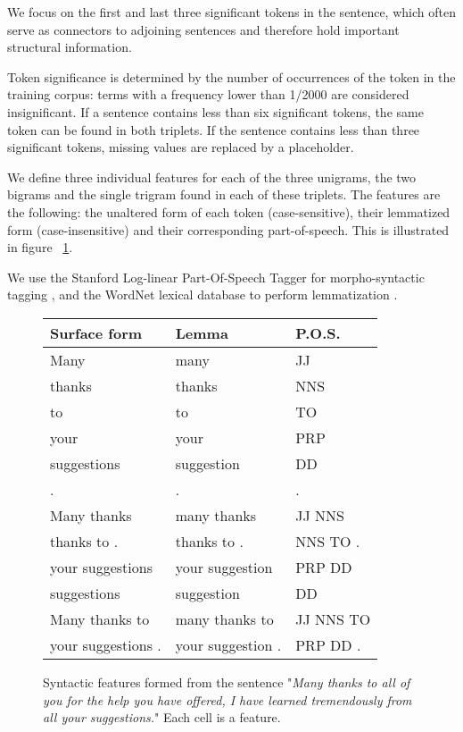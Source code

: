 We focus on the first and last three significant tokens in the sentence, which often serve as connectors to adjoining sentences and therefore hold important structural information.

Token significance is determined by the number of occurrences of the token in the training corpus: terms with a frequency lower than 1/2000 are considered insignificant. If a sentence contains less than six significant tokens, the same token can be found in both triplets. If the sentence contains less than three significant tokens, missing values are replaced by a placeholder.

We define three individual features for each of the three unigrams, the two bigrams and the single trigram found in each of these triplets. The features are the following: the unaltered form of each token (case-sensitive), their lemmatized form (case-insensitive) and their corresponding part-of-speech. This is illustrated in figure ~\ref{fig:exampleSyntacticFeatures}.

We use the Stanford Log-linear Part-Of-Speech Tagger for morpho-syntactic tagging \cite{toutanova2003feature}, and the WordNet lexical database to perform lemmatization \cite{miller1995wordnet}.

\begin{figure}\small\centering
\begin{tabular}{*{2}{|l}|l|}
\toprule
\textbf{Surface form} & \textbf{Lemma} & \textbf{P.O.S.}\\
	\midrule
	Many & many & JJ\\
	thanks & thanks & NNS\\
	to & to & TO\\
	your & your & PRP\\
	suggestions & suggestion & DD\\
	. & . & .\\
	Many thanks & many thanks & JJ NNS\\
	thanks to . & thanks to . & NNS TO . \\
	your suggestions & your suggestion & PRP DD\\
	suggestions & suggestion & DD\\
	Many thanks to & many thanks to & JJ NNS TO\\
	your suggestions . & your suggestion . & PRP DD .\\
	\bottomrule
\end{tabular}

\caption{Syntactic features formed from the sentence "\textit{Many thanks to all of you for the help you have offered, I have learned tremendously from all your suggestions.}" Each cell is a feature.}
\label{fig:exampleSyntacticFeatures}
\end{figure}

